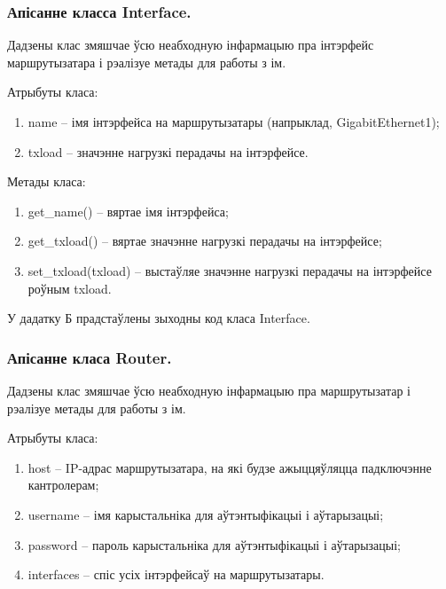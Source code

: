\vspace{-\baselineskip}

\subsubsection{Апісанне класса Interface.}

Дадзены клас змяшчае ўсю неабходную інфармацыю пра інтэрфейс маршрутызатара і
рэалізуе метады для работы з ім.

Атрыбуты класа:
\begin{enumerate}
    \item name -- імя інтэрфейса на маршрутызатары (напрыклад, GigabitEthernet1);
    \item txload -- значэнне нагрузкі перадачы на інтэрфейсе.
\end{enumerate}

Метады класа:
\begin{enumerate}
    \item get\_name() -- вяртае імя інтэрфейса;
    \item get\_txload() -- вяртае значэнне нагрузкі перадачы на інтэрфейсе;
    \item set\_txload(txload) -- выстаўляе значэнне нагрузкі перадачы на інтэрфейсе
    роўным txload.
\end{enumerate}

У дадатку Б прадстаўлены зыходны код класа Interface.

%
%
%

\subsubsection{Апісанне класа Router.}

Дадзены клас змяшчае ўсю неабходную інфармацыю пра маршрутызатар і рэалізуе
метады для работы з ім.

Атрыбуты класа:
\begin{enumerate}
    \item host -- IP-адрас маршрутызатара, на які будзе ажыццяўляцца падключэнне кантролерам;
    \item username -- імя карыстальніка для аўтэнтыфікацыі і аўтарызацыі;
    \item password -- пароль карыстальніка для аўтэнтыфікацыі і аўтарызацыі;
    \item interfaces -- спіс усіх інтэрфейсаў на маршрутызатары.
\end{enumerate}

